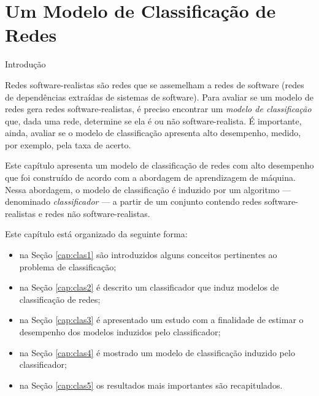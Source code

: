 \chapter{Um Modelo de Classificação de Redes} \label{cap:classificacao}


\begin{section}{Introdução}
	
	
	Redes software-realistas são redes que se assemelham a redes de software (redes de dependências extraídas de sistemas de software). Para avaliar se um modelo de redes gera redes software-realistas, é preciso encontrar um \emph{modelo de classificação} que, dada uma rede, determine se ela é ou não software-realista. É importante, ainda, avaliar se o modelo de classificação apresenta alto desempenho, medido, por exemplo, pela taxa de acerto.
	
	Este capítulo apresenta um modelo de classificação de redes com alto desempenho que foi construído de acordo com a abordagem de aprendizagem de máquina. Nessa abordagem, o modelo de classificação é induzido por um algoritmo --- denominado \emph{classificador} --- a partir de um conjunto contendo redes software-realistas e redes não software-realistas.
	
	Este capítulo está organizado da seguinte forma:
	
	\begin{itemize}
		\item na Seção \ref{cap:clas1} são introduzidos alguns conceitos pertinentes ao problema de classificação;
		\item na Seção \ref{cap:clas2} é descrito um classificador que induz modelos de classificação de redes;
		\item na Seção \ref{cap:clas3} é apresentado um estudo com a finalidade de estimar o desempenho dos modelos induzidos pelo classificador;
		\item na Seção \ref{cap:clas4} é mostrado um modelo de classificação induzido pelo classificador;
		\item na Seção \ref{cap:clas5} os resultados mais importantes são recapitulados.
	\end{itemize}	
	
\end{section}

